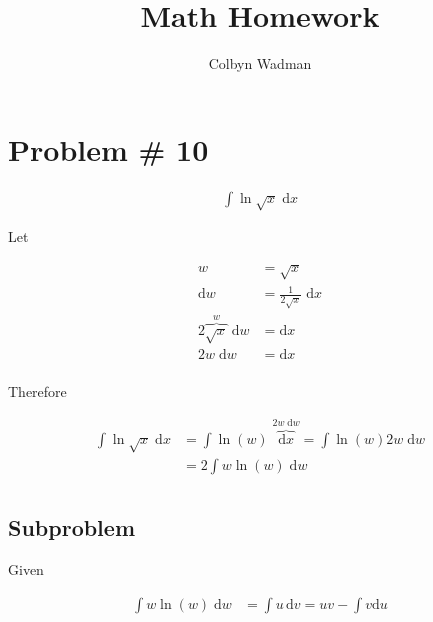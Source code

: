\documentclass{article}
\title{Math Homework}
\author{Colbyn Wadman}
\begin{document}
\maketitle

 



\section*{Problem \# 10}

\begin{equation}
\begin{split}
    \int\ln\sqrt{x} \;\mathrm{d}x
\end{split}
\end{equation}

Let

\begin{equation}
\begin{split}
    w &= \sqrt{x} \\
    \mathrm{d}w &= \frac{1}{2\sqrt{x}} \;\mathrm{d}x \\
    2\overbrace{\sqrt{x}}^{w} \;\mathrm{d}w &= \mathrm{d}x \\
    2w \;\mathrm{d}w &= \mathrm{d}x \\
\end{split}
\end{equation}

Therefore

\begin{equation}
\begin{split}
    \int\ln\sqrt{x} \;\mathrm{d}x
        &= \int\ln(w) \;\overbrace{\mathrm{d}x}^{2w \;\mathrm{d}w}
         = \int\ln(w) 2w \;\mathrm{d}w \\
        &= 2\int w \ln(w) \;\mathrm{d}w \\
\end{split}
\end{equation}

\subsection*{Subproblem}

Given

\begin{equation}
\begin{split}
    \int w \ln(w) \;\mathrm{d}w &= \int u\,\mathrm{d}v = uv - \int v \mathrm{d}u \\
\end{split}
\end{equation}
\end{document}
